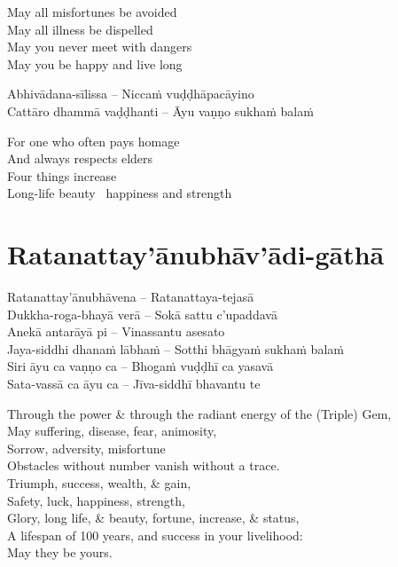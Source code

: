 \begin{english-verses}
  May all misfortunes be avoided\\
  May all illness be dispelled\\
  May you never meet with dangers\\
  May you be happy and live long
\end{english-verses}

\suttaRef{[Khp A]}

\begin{twochants}
  Abhivādana-sīlissa – Niccaṁ vuḍḍhāpacāyino\\
  Cattāro dhammā vaḍḍhanti – Āyu vaṇṇo sukhaṁ balaṁ
\end{twochants}

\begin{english-verses}
  For one who often pays homage\\
  And always respects elders\\
  Four things increase\\
  Long-life beauty \breathmark\ happiness and strength
\end{english-verses}

\suttaRef{[Dhp 109]}

\section{Ratanattay'ānubhāv'ādi-gāthā}
\label{ratanattayanubhavadi-gatha}

\begin{pali-hang}
Ratanattay'ānubhāvena – Ratanattaya-tejasā\\
Dukkha-roga-bhayā verā – Sokā sattu c'upaddavā\\
Anekā antarāyā pi – Vinassantu asesato\\
Jaya-siddhi dhanaṁ lābhaṁ – Sotthi bhāgyaṁ sukhaṁ balaṁ\\
Siri āyu ca vaṇṇo ca – Bhogaṁ vuḍḍhī ca yasavā\\
Sata-vassā ca āyu ca – Jīva-siddhī bhavantu te
\end{pali-hang}

\begin{english-verses}
  Through the power \& through the radiant energy of the (Triple) Gem,\\
  May suffering, disease, fear, animosity,\\
  Sorrow, adversity, misfortune\\
  Obstacles without number vanish without a trace.\\
  Triumph, success, wealth, \& gain,\\
  Safety, luck, happiness, strength,\\
  Glory, long life, \& beauty, fortune, increase, \& status,\\
  A lifespan of 100 years, and success in your livelihood:\\
  May they be yours.
\end{english-verses}

